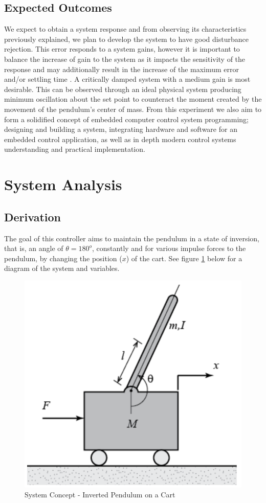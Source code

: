 \documentclass[12pt]{article}
\begin{document}
\subsection{Expected Outcomes}
We expect to obtain a system response and from observing its characteristics previously explained, we plan to develop the system to have good disturbance rejection. This error responds to a system gains, however it is important to balance the increase of gain to the system as it impacts the sensitivity of the response and may additionally result in the increase of the maximum error and/or settling time \cite{OCLoop}. A critically damped system with a medium gain is most desirable. This can be observed through an ideal physical system producing minimum oscillation about the set point to counteract the moment created by the movement of the pendulum's center of mass. From this experiment we also aim to form a solidified concept of embedded computer control system programming; designing and building a system, integrating hardware and software for an embedded control application, as well as in depth modern control systems understanding and practical implementation.

\section{System Analysis}
\label{model}
\subsection{Derivation}
The goal of this controller aims to maintain the pendulum in a state of inversion, that is, an angle of $\theta = 180^o$, constantly and for various impulse forces to the pendulum, by changing the position ($x$) of the cart. See figure \ref{fig:pend} below for a diagram of the system and variables.
\begin{figure}[H]
    \centering
    \includegraphics[width=.4\linewidth]{figures/pend.png}
    \caption{System Concept - Inverted Pendulum on a Cart \cite{inv}}
    \label{fig:pend}
\end{figure}
\end{document}
